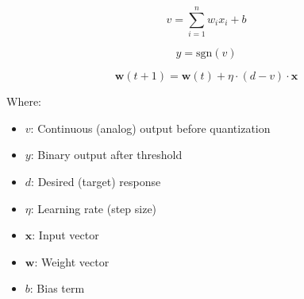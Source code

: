 
\begin{equation}
v = \sum_{i=1}^{n} w_i x_i + b
\end{equation}

\begin{equation}
y = \text{sgn}(v)
\end{equation}

\begin{equation}
\boxed{\mathbf{w}(t+1) = \mathbf{w}(t) + \eta \cdot (d - v) \cdot \mathbf{x}}
\end{equation}

Where:
\begin{itemize}
    \item $v$: Continuous (analog) output before quantization
    \item $y$: Binary output after threshold
    \item $d$: Desired (target) response
    \item $\eta$: Learning rate (step size)
    \item $\mathbf{x}$: Input vector
    \item $\mathbf{w}$: Weight vector
    \item $b$: Bias term
\end{itemize}